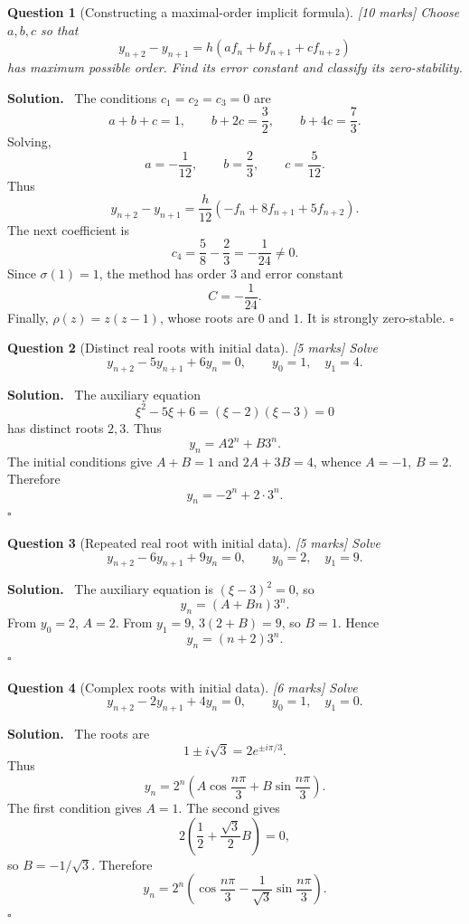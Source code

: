 \documentclass[11pt,a4paper]{article}
\theoremstyle{questionstyle}
\newtheorem{question}{Question}
\newenvironment{solution}
  {\par\noindent\textbf{\color{solutiongreen}Solution.}\ }
  {\hfill$\square$\par}
\newcommand{\pointmark}[1]{\hfill\textnormal{\textit{[#1 marks]}}}
\begin{document}
\begin{question}[Constructing a maximal-order implicit formula]\pointmark{10}
Choose \(a,b,c\) so that
\[
  y_{n+2}-y_{n+1}
  =h(af_n+bf_{n+1}+cf_{n+2})
\]
has maximum possible order.  Find its error constant and classify its
zero-stability.
\end{question}

\begin{solution}
The conditions \(c_1=c_2=c_3=0\) are
\[
  a+b+c=1,\qquad
  b+2c=\frac32,\qquad
  b+4c=\frac73.
\]
Solving,
\[
  a=-\frac1{12},\qquad
  b=\frac23,\qquad
  c=\frac5{12}.
\]
Thus
\[
  y_{n+2}-y_{n+1}
  =\frac h{12}(-f_n+8f_{n+1}+5f_{n+2}).
\]
The next coefficient is
\[
  c_4=\frac58-\frac23=-\frac1{24}\neq0.
\]
Since \(\sigma(1)=1\), the method has order \(3\) and error constant
\[
  \boxed{C=-\frac1{24}}.
\]
Finally, \(\rho(z)=z(z-1)\), whose roots are \(0\) and \(1\).
It is strongly zero-stable.
\end{solution}

\begin{question}[Distinct real roots with initial data]\pointmark{5}
Solve
\[
  y_{n+2}-5y_{n+1}+6y_n=0,
  \qquad y_0=1,\quad y_1=4.
\]
\end{question}

\begin{solution}
The auxiliary equation
\[
  \xi^2-5\xi+6=(\xi-2)(\xi-3)=0
\]
has distinct roots \(2,3\).  Thus
\[
  y_n=A2^n+B3^n.
\]
The initial conditions give \(A+B=1\) and \(2A+3B=4\), whence
\(A=-1\), \(B=2\).  Therefore
\[
  \boxed{y_n=-2^n+2\cdot3^n}.
\]
\end{solution}

\begin{question}[Repeated real root with initial data]\pointmark{5}
Solve
\[
  y_{n+2}-6y_{n+1}+9y_n=0,
  \qquad y_0=2,\quad y_1=9.
\]
\end{question}

\begin{solution}
The auxiliary equation is \((\xi-3)^2=0\), so
\[
  y_n=(A+Bn)3^n.
\]
From \(y_0=2\), \(A=2\).  From \(y_1=9\),
\(3(2+B)=9\), so \(B=1\).  Hence
\[
  \boxed{y_n=(n+2)3^n}.
\]
\end{solution}

\begin{question}[Complex roots with initial data]\pointmark{6}
Solve
\[
  y_{n+2}-2y_{n+1}+4y_n=0,
  \qquad y_0=1,\quad y_1=0.
\]
\end{question}

\begin{solution}
The roots are
\[
  1\pm i\sqrt3
  =2e^{\pm i\pi/3}.
\]
Thus
\[
  y_n=2^n\left(A\cos\frac{n\pi}{3}
  +B\sin\frac{n\pi}{3}\right).
\]
The first condition gives \(A=1\).  The second gives
\[
  2\left(\frac12+\frac{\sqrt3}{2}B\right)=0,
\]
so \(B=-1/\sqrt3\).  Therefore
\[
  \boxed{
  y_n=2^n\left(\cos\frac{n\pi}{3}
  -\frac1{\sqrt3}\sin\frac{n\pi}{3}\right)}.
\]
\end{solution}
\end{document}
